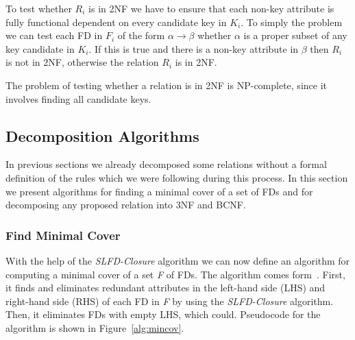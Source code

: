 To test whether $R_i$ is in 2NF we have to ensure that each non-key attribute is fully
functional dependent on every candidate key in $K_i$. To simply the problem we can test
each FD in $F_i$ of the form $\alpha \rightarrow \beta$ whether $\alpha$ is a proper subset
of any key candidate in $K_i$. If this is true and there is a non-key attribute in $\beta$ then
$R_i$ is not in 2NF, otherwise the relation $R_i$ is in 2NF.

The problem of testing whether a relation is in 2NF is NP-complete, 
since it involves finding all candidate keys.

\subsection{Decomposition Algorithms}
\label{sec:algdec}
In previous sections we already decomposed some relations without
a formal definition of the rules which we were following during this process. 
In this section we present algorithms for finding a minimal cover of a set of FDs and 
for decomposing any proposed relation into 3NF and BCNF.  

\subsubsection{Find Minimal Cover}  
With the help of the \textit{SLFD-Closure} algorithm we can now define an algorithm 
for computing a minimal cover of a set \textit{F} of FDs. 
The algorithm comes form~\cite[Section 6.3.1]{bdb2}. First, it finds and eliminates 
redundant attributes in the left-hand side (LHS) and right-hand side (RHS) 
of each FD in \textit{F} by using the \textit{SLFD-Closure} algorithm. Then, it eliminates FDs with 
empty LHS, which could. Pseudocode for the algorithm is shown in Figure~\ref{alg:mincov}.


